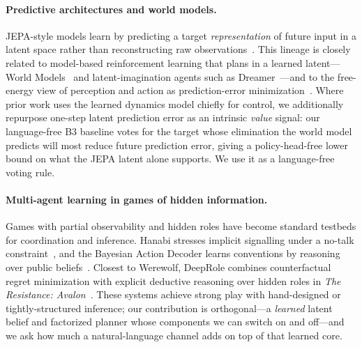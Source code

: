 \documentclass[11pt]{article}
\begin{document}
\paragraph{Predictive architectures and world models.} JEPA-style models learn by
predicting a target \emph{representation} of future input in a latent space rather
than reconstructing raw observations~\citep{lecun2022path,assran2023ijepa}. This
lineage is closely related to model-based reinforcement learning that plans in a
learned latent---World Models~\citep{ha2018world} and latent-imagination agents
such as Dreamer~\citep{hafner2020dream}---and to the free-energy view of
perception and action as prediction-error
minimization~\citep{friston2010free}. Where prior work uses the learned dynamics
model chiefly for control, we additionally repurpose one-step latent prediction
error as an intrinsic \emph{value} signal: our language-free B3 baseline votes for
the target whose elimination the world model predicts will most reduce future
prediction error, giving a policy-head-free lower bound on what the JEPA latent
alone supports. We use it as a language-free voting rule.

\paragraph{Multi-agent learning in games of hidden information.} Games with
partial observability and hidden roles have become standard testbeds for
coordination and inference. Hanabi stresses implicit signalling under a no-talk
constraint~\citep{bard2020hanabi}, and the Bayesian Action Decoder learns
conventions by reasoning over public
beliefs~\citep{foerster2019bayesian}. Closest to Werewolf, DeepRole combines
counterfactual regret minimization with explicit deductive reasoning over hidden
roles in \emph{The Resistance: Avalon}~\citep{serrino2019finding}. These systems
achieve strong play with hand-designed or tightly-structured inference; our
contribution is orthogonal---a \emph{learned} latent belief and factorized planner
whose components we can switch on and off---and we ask how much a natural-language
channel adds on top of that learned core.
\end{document}
